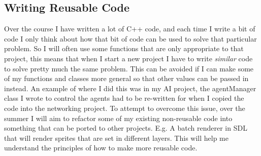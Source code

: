 \documentclass{scrartcl}
\begin{document}
\subsection{Writing Reusable Code}
Over the course I have written a lot of C++ code, and each time I write a bit of code I only think about how that bit of code can be used to solve that particular problem. So I will often use some functions that are only appropriate to that project, this means that when I start a new project I have to write \textit{similar} code to solve pretty much the same problem. This can be avoided if I can make some of my functions and classes more general so that other values can be passed in instead. An example of where I did this was in my AI project, the agentManager class I wrote to control the agents had to be re-written for when I copied the code into the networking project.
To attempt to overcome this issue, over the summer I will aim to refactor some of my existing non-reusable code into something that can be ported to other projects. E.g. A batch renderer in SDL that will render sprites that are set in different layers. This will help me understand the principles of how to make more reusable code.

\end{document}
